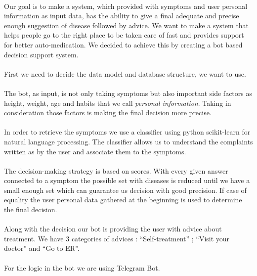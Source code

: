 	\paragraph{} 
	Our goal is to make a system, which provided with symptoms and user personal information as input data, has the ability to give a final adequate and precise enough suggestion of disease followed by advice. We want to make a system that helps people go to the right place to be taken care of fast and provides support for better auto-medication.
	We decided to achieve this by creating a bot based decision support system.
	\paragraph{}
	First we need to decide the data model and database structure, we want to use.
	\paragraph{}
	The bot, as input, is not only taking symptoms but also important side factors as height, weight, age and habits that we call \textit{personal information}. Taking in consideration those factors is making the final decision more precise. 
	\paragraph{}
	In order to retrieve the symptoms we use a classifier using python scikit-learn for natural language processing. The classifier allows us to understand the complaints written as by the user and associate them to the symptoms.
	\paragraph{}
	The decision-making strategy is based on scores. With every given answer connected to a symptom the possible set with diseases is reduced until we have a small enough set which can guarantee us decision with good precision. If case of equality the user personal data gathered at the beginning is used to determine the final decision. 
	\paragraph{}
	Along with the decision our bot is providing the user with advice about treatment. We have 3 categories of advices :
	“Self-treatment” ; “Visit your doctor” and “Go to ER”. 
	\paragraph{}
	For the logic in the bot we are using Telegram Bot. 
	
	
	
	
	
	
	
	
	
	
	
	
	
	
  

